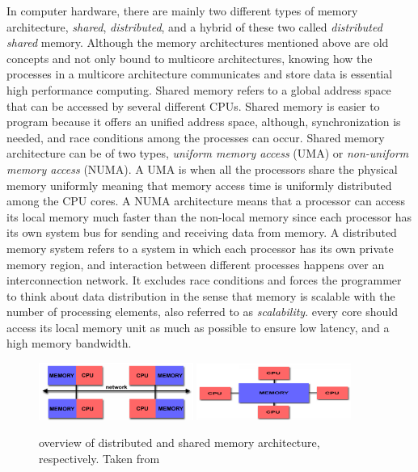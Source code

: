 In computer hardware, there are mainly two different types of memory architecture, \textit{shared}, \textit{distributed}, and a hybrid of these two called \textit{distributed shared} memory. Although the memory architectures mentioned above are old concepts and not only bound to multicore architectures, knowing how the processes in a multicore architecture communicates and store data is essential high performance computing. Shared memory refers to a global address space that can be accessed by several different CPUs. Shared memory is easier to program because it offers an unified address space, although, synchronization is needed, and race conditions among the processes can occur. Shared memory architecture can be of two types, \textit{uniform memory access} (UMA) or \textit{non-uniform memory access} (NUMA). A UMA is when all the processors share the physical memory uniformly \cite{article8} meaning that memory access time is uniformly distributed among the CPU cores. A NUMA architecture means that a processor can access its local memory much faster than the non-local memory since each processor has its own system bus for sending and receiving data from memory. A distributed memory system refers to a system in which each processor has its own private memory region, and interaction between different processes happens over an interconnection network. It excludes race conditions and forces the programmer to think about data distribution in the sense that memory is scalable with the number of processing elements, also referred to as \textit{scalability}. every core should access its local memory unit as much as possible to ensure low latency, and a high memory bandwidth. 

\begin{figure}[!h]
  \begin{center}
    \label{b_distributed_memory.png}
    \includegraphics[width=0.45\textwidth]{bilder/b_distributed_memory}
    \label{b_shared_memory.png}
    \includegraphics[width=0.45\textwidth]{bilder/b_shared_memory}
  \end{center}
  \caption{overview of distributed and shared memory architecture, respectively. Taken from \cite{article8}}
  \label{b_memory_hierarchy}
\end{figure}

